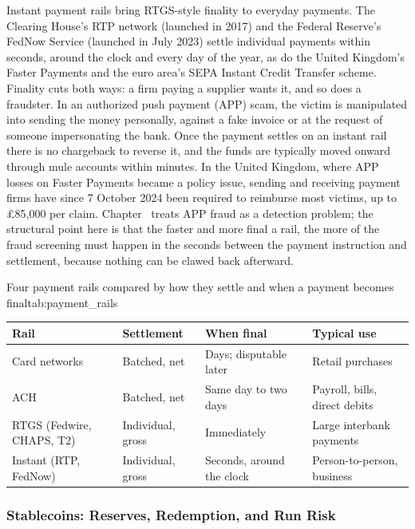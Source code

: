 \documentclass[../ai_in_finance]{subfiles}
\begin{document}
Instant payment rails bring RTGS-style finality to everyday payments. The Clearing House's RTP network (launched in 2017) and the Federal Reserve's FedNow Service (launched in July 2023) settle individual payments within seconds, around the clock and every day of the year, as do the United Kingdom's Faster Payments and the euro area's SEPA Instant Credit Transfer scheme. Finality cuts both ways: a firm paying a supplier wants it, and so does a fraudster. In an authorized push payment (APP) scam, the victim is manipulated into sending the money personally, against a fake invoice or at the request of someone impersonating the bank. Once the payment settles on an instant rail there is no chargeback to reverse it, and the funds are typically moved onward through mule accounts within minutes. In the United Kingdom, where APP losses on Faster Payments became a policy issue, sending and receiving payment firms have since 7 October 2024 been required to reimburse most victims, up to \pounds85{,}000 per claim. Chapter~ treats APP fraud as a detection problem; the structural point here is that the faster and more final a rail, the more of the fraud screening must happen in the seconds between the payment instruction and settlement, because nothing can be clawed back afterward.

\begin{booktable}[htbp]{Four payment rails compared by how they settle and when a payment becomes final}{tab:payment_rails}
\small
\begin{tabular}{llll}
\toprule
Rail & Settlement & When final & Typical use \\
\midrule
Card networks & Batched, net & Days; disputable later & Retail purchases \\
ACH & Batched, net & Same day to two days & Payroll, bills, direct debits \\
RTGS (Fedwire, CHAPS, T2) & Individual, gross & Immediately & Large interbank payments \\
Instant (RTP, FedNow) & Individual, gross & Seconds, around the clock & Person-to-person, business \\
\bottomrule
\end{tabular}
\end{booktable}

\subsubsection*{Stablecoins: Reserves, Redemption, and Run Risk}
\end{document}
